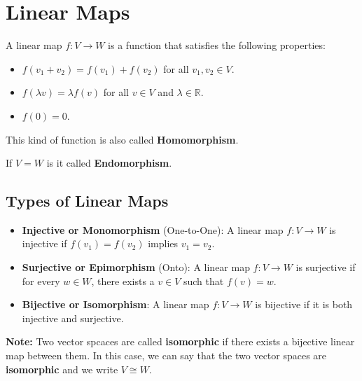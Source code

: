 \section{Linear Maps}
A linear map \( f: V \to W \) is a function that satisfies the following properties:

\begin{itemize}[label=\(-\)]
    \item \( f(v_1 + v_2) = f(v_1) + f(v_2) \) for all \( v_1, v_2 \in V \).
    \item \( f(\lambda v) = \lambda f(v) \) for all \( v \in V \) and \( \lambda \in \mathbb{R} \).
    \item \( f(0) = 0 \).
\end{itemize} 

\noindent This kind of function is also called \textbf{Homomorphism}.

\noindent If \(V = W\) is it called \textbf{Endomorphism}.

\subsection{Types of Linear Maps}
\begin{itemize}[label=\(-\)]
    \item \textbf{Injective or Monomorphism} (One-to-One): A linear map \( f: V \to W \) is injective if \( f(v_1) = f(v_2) \) implies \( v_1 = v_2 \).
    \item \textbf{Surjective or Epimorphism} (Onto): A linear map \( f: V \to W \) is surjective if for every \( w \in W \), there exists a \( v \in V \) such that \( f(v) = w \).
    \item \textbf{Bijective or Isomorphism}: A linear map \( f: V \to W \) is bijective if it is both injective and surjective.
\end{itemize}

\noindent\textbf{Note:} Two vector spcaces are called 
\textbf{isomorphic} if there exists a bijective linear map between them. In this case, we can say that the two vector spaces are \textbf{isomorphic} and we write \( V \cong W \).

